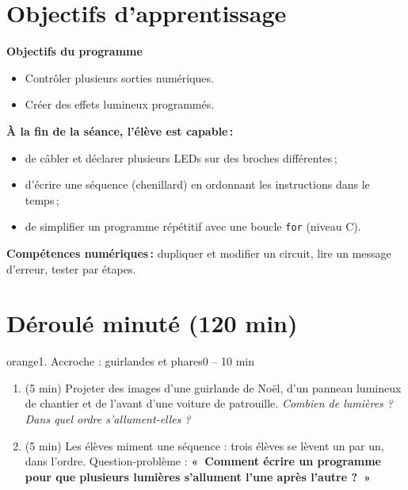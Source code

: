 \documentclass[11pt,a4paper]{article}
\begin{document}
\section{Objectifs d'apprentissage}
\begin{tcolorbox}[colback=gray!8,colframe=gray!60!black,arc=1mm,boxrule=0.5pt]
\textbf{Objectifs du programme}
\begin{itemize}
 \item Contrôler plusieurs sorties numériques.
 \item Créer des effets lumineux programmés.
\end{itemize}
\textbf{À la fin de la séance, l'élève est capable\,:}
\begin{itemize}
 \item de câbler et déclarer plusieurs LEDs sur des broches différentes\,;
 \item d'écrire une séquence (chenillard) en ordonnant les instructions dans le temps\,;
 \item de simplifier un programme répétitif avec une boucle \texttt{for} (niveau C).
\end{itemize}
\textbf{Compétences numériques\,:} dupliquer et modifier un circuit, lire un message d'erreur, tester par étapes.
\end{tcolorbox}

\section{Déroulé minuté (120 min)}

\begin{etape}{orange}{1. Accroche : guirlandes et phares}{0 -- 10 min}
\begin{enumerate}
 \item (5 min) Projeter des images d'une guirlande de Noël, d'un panneau lumineux de chantier et de l'avant d'une voiture de patrouille. \emph{Combien de lumières ? Dans quel ordre s'allument-elles ?}
 \item (5 min) Les élèves miment une séquence : trois élèves se lèvent un par un, dans l'ordre. Question-problème : \textbf{«~Comment écrire un programme pour que plusieurs lumières s'allument l'une après l'autre ?~»}
\end{enumerate}
\end{etape}
\end{document}
